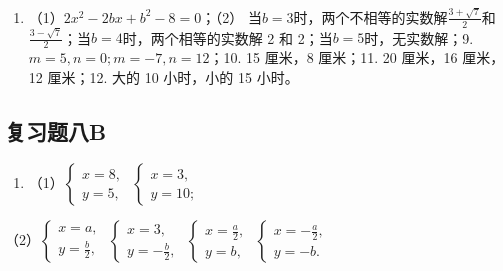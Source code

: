 \begin{enumerate}[start=8]
\item
  （1）\(2x^{2} - 2bx + b^{2} - 8 = 0\)；（2）
  当\(b = 3\)时，两个不相等的实数解\(\frac{3 + \sqrt{7}}{2}\)和\(\frac{3 - \sqrt{7}}{2}\)；当\(b = 4\)时，两个相等的实数解
  2 和
  2；当\(b = 5\)时，无实数解；9.\(m = 5, n = 0; m = -7, n = 12\)；10. 15
  厘米，8 厘米；11. 20 厘米，16 厘米，12 厘米；12. 大的 10 小时，小的 15
  小时。
\end{enumerate}

\subsection{复习题八B}

\begin{enumerate}
\item
  （1）\(\left\{ \begin{array}{l} x = 8, \\ y = 5, \end{array} \right.\) \(\left\{ \begin{array}{l} x = 3, \\ y = 10; \end{array} \right.\)
\end{enumerate}

（2）\(\left\{ \begin{array}{l} x = a, \\ y = \frac{b}{2}, \end{array} \right.\) \(\left\{ \begin{array}{l} x = 3, \\ y = -\frac{b}{2}, \end{array} \right.\) \(\left\{ \begin{array}{l} x = \frac{a}{2}, \\ y = b, \end{array} \right.\) \(\left\{ \begin{array}{l} x = -\frac{a}{2}, \\ y = -b. \end{array} \right.\)

